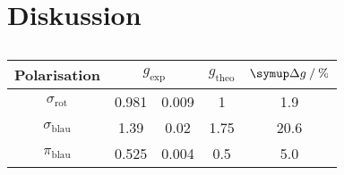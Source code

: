 \section{Diskussion}
\begin{table}
  \centering
  \caption{}
  \label{}
  \begin{tabular}{c S @{${}\pm{}$} S S S}
    \toprule
    Polarisation &  & {$g_\text{theo}$} & {$\upD g \:/\: \si{\percent}$} \\
    \midrule
    $\sigma_\text{rot}$  & 0.981 & 0.009 & 1    &  1.9 \\
    $\sigma_\text{blau}$ & 1.39  & 0.02  & 1.75 & 20.6 \\
    $\pi_\text{blau}$    & 0.525 & 0.004 & 0.5  &  5.0 \\
    \bottomrule
  \end{tabular}
\end{table}
